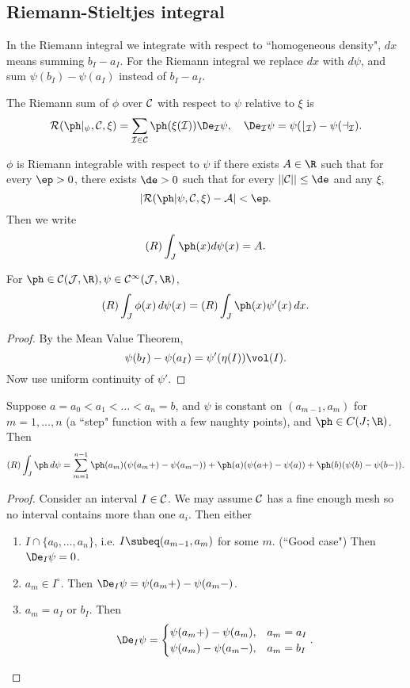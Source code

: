 \subsection{Riemann-Stieltjes integral}
In the Riemann integral we integrate with respect to ``homogeneous density", $dx$ means summing $b_I-a_I$. For the Riemann integral we replace $dx$ with $d\psi$, and sum $\psi(b_I)-\psi(a_I)$ instead of $b_I-a_I$.
\begin{df}
The Riemann sum of $\phi$ over $\cal C$ with respect to $\psi$ relative to $\xi$ is
\[
\cal R(\ph|_{\psi}, \cal C, \xi)=\sum_{I\in \cal C} \ph(\xi(I))\De_I\psi,\quad \De_I\psi=\psi(b_I)-\psi(a_I).
\]

$\phi$ is Riemann integrable with respect to $\psi$ if there exists $A\in \R$ such that for every $\ep>0$, there exists $\de>0$ such that for every $||\cal C||\leq \de$ and any $\xi$,
\[|\cal R(\ph|\psi, \cal C, \xi)-A|<\ep.\]
Then we write
\[
(R)\int_{J} \ph(x)d\psi(x)=A.
\]
\end{df}
\begin{pr}
For $\ph\in \cal C(J,\R), \psi\in C^1(J,\R)$,
\[
(R)\int_J \phi(x) \,d\psi(x)=(R)\int_J \ph(x)\psi'(x)\,dx.
\]
\end{pr}
\begin{proof}
By the Mean Value Theorem,
\[
\psi(b_I)-\psi(a_I)=\psi'(\eta(I))\vol(I).
\]
Now use uniform continuity of $\psi'$.
\end{proof}
\begin{ex}
Suppose $a=a_0<a_1<\ldots<a_n=b$, and $\psi$ is constant on $(a_{m-1},a_m)$ for $m=1,\ldots, n$ (a ``step" function with a few naughty points), and $\ph\in C(J;\R)$. Then
\[
(R)\int_J \ph\,d\psi
=
\sum_{m=1}^{n-1} \ph(a_m)(\psi(a_m+)-\psi(a_m-))+\ph(a)(\psi(a+)-\psi(a))+\ph(b)(\psi(b)-\psi(b-)).
\]
\end{ex}
\begin{proof}
Consider an interval $I\in \cal C$. We may assume $\cal C$ has a fine enough mesh so no interval contains more than one $a_i$. Then either
\begin{enumerate}
\item
$I\cap \{a_0,\ldots, a_n\}$, i.e. $I\subeq (a_{m-1},a_m)$ for some $m$. (``Good case") Then $\De_I\psi =0$.
\item
$a_m\in I^{\circ}$. Then $\De_I\psi=\psi(a_m+)-\psi(a_m-)$.
\item
$a_m=a_I$ or $b_I$. Then
\[
\De_I\psi=\begin{cases}
\psi(a_m+)-\psi(a_m),&a_m=a_I\\
\psi(a_m)-\psi(a_m-),&a_m=b_I
\end{cases}.
\]
\end{enumerate}
\end{proof}
